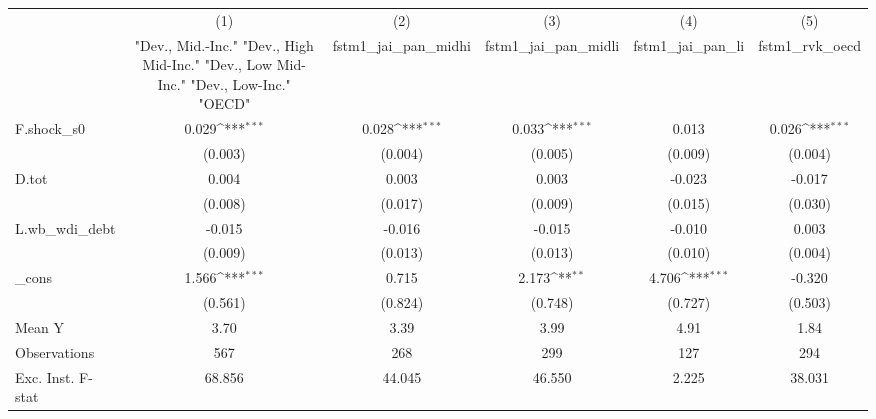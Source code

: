 {
\def\sym#1{\ifmmode^{#1}\else\(^{#1}\)\fi}
\begin{tabular}{l*{5}{c}}
\toprule
            &\multicolumn{1}{c}{(1)}&\multicolumn{1}{c}{(2)}&\multicolumn{1}{c}{(3)}&\multicolumn{1}{c}{(4)}&\multicolumn{1}{c}{(5)}\\
            &\multicolumn{1}{c}{ "Dev., Mid.-Inc." "Dev., High Mid-Inc." "Dev., Low Mid-Inc." "Dev., Low-Inc." "OECD" }&\multicolumn{1}{c}{fstm1\_jai\_pan\_midhi}&\multicolumn{1}{c}{fstm1\_jai\_pan\_midli}&\multicolumn{1}{c}{fstm1\_jai\_pan\_li}&\multicolumn{1}{c}{fstm1\_rvk\_oecd}\\
\midrule
F.shock\_s0  &       0.029\sym{***}&       0.028\sym{***}&       0.033\sym{***}&       0.013         &       0.026\sym{***}\\
            &     (0.003)         &     (0.004)         &     (0.005)         &     (0.009)         &     (0.004)         \\
\addlinespace
D.tot       &       0.004         &       0.003         &       0.003         &      -0.023         &      -0.017         \\
            &     (0.008)         &     (0.017)         &     (0.009)         &     (0.015)         &     (0.030)         \\
\addlinespace
L.wb\_wdi\_debt&      -0.015         &      -0.016         &      -0.015         &      -0.010         &       0.003         \\
            &     (0.009)         &     (0.013)         &     (0.013)         &     (0.010)         &     (0.004)         \\
\addlinespace
\_cons      &       1.566\sym{***}&       0.715         &       2.173\sym{**} &       4.706\sym{***}&      -0.320         \\
            &     (0.561)         &     (0.824)         &     (0.748)         &     (0.727)         &     (0.503)         \\
\midrule
Mean Y      &        3.70         &        3.39         &        3.99         &        4.91         &        1.84         \\
Observations&         567         &         268         &         299         &         127         &         294         \\
Exc. Inst. F-stat&      68.856         &      44.045         &      46.550         &       2.225         &      38.031         \\
\bottomrule
\end{tabular}
}
